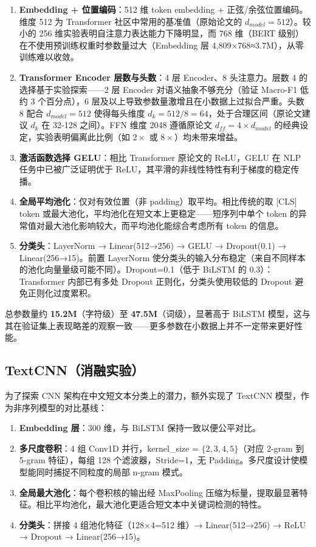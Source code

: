 \begin{enumerate}
\item \textbf{Embedding + 位置编码}：512 维 token embedding + 正弦/余弦位置编码。维度 512 为 Transformer 社区中常用的基准值（原始论文的 $d_{model}=512$）。较小的 256 维实验表明自注意力表达能力下降明显，而 768 维（BERT 级别）在不使用预训练权重时参数量过大（Embedding 层 4,809×768≈3.7M），从零训练难以收敛。

\item \textbf{Transformer Encoder 层数与头数}：4 层 Encoder、8 头注意力。层数 4 的选择基于实验探索——2 层 Encoder 对语义抽象不够充分（验证 Macro-F1 低约 3 个百分点），6 层及以上导致参数量激增且在小数据上过拟合严重。头数 8 配合 $d_{model}=512$ 使得每头维度 $d_k = 512/8 = 64$，处于合理区间（原论文建议 $d_k$ 在 32-128 之间）。FFN 维度 2048 遵循原论文 $d_{ff}=4 \times d_{model}$ 的经典设定，实验表明偏离此比例（如 $2\times$ 或 $8\times$）均未带来增益。

\item \textbf{激活函数选择 GELU}：相比 Transformer 原论文的 ReLU，GELU 在 NLP 任务中已被广泛证明优于 ReLU\cite{devlin2018}，其平滑的非线性特性有利于梯度的稳定传播。

\item \textbf{全局平均池化}：仅对有效位置（非 padding）取平均。相比传统的取 [CLS] token 或最大池化，平均池化在短文本上更稳定——短序列中单个 token 的异常值对最大池化影响较大，而平均池化能综合考虑所有 token 的信息。

\item \textbf{分类头}：LayerNorm → Linear(512→256) → GELU → Dropout(0.1) → Linear(256→15)。前置 LayerNorm 使分类头的输入分布稳定（来自不同样本的池化向量量级可能不同）。Dropout=0.1（低于 BiLSTM 的 0.3）：Transformer 内部已有多处 Dropout 正则化，分类头使用较低的 Dropout 避免正则化过度累积。
\end{enumerate}

总参数量约 \textbf{15.2M}（字符级）至 \textbf{47.5M}（词级），显著高于 BiLSTM 模型，这与其在验证集上表现略差的观察一致——更多参数在小数据上并不一定带来更好性能。

\subsection{TextCNN（消融实验）}

为了探索 CNN 架构在中文短文本分类上的潜力，额外实现了 TextCNN 模型\cite{kim2014}，作为非序列模型的对比基线：

\begin{enumerate}
\item \textbf{Embedding 层}：300 维，与 BiLSTM 保持一致以便公平对比。
\item \textbf{多尺度卷积}：4 组 Conv1D 并行，kernel\_size = $\{2,3,4,5\}$（对应 2-gram 到 5-gram 特征），每组 128 个滤波器，Stride=1，无 Padding。多尺度设计使模型能同时捕捉不同粒度的局部 n-gram 模式。
\item \textbf{全局最大池化}：每个卷积核的输出经 MaxPooling 压缩为标量，提取最显著特征。相比平均池化，最大池化更适合短文本中关键词检测的特性。
\item \textbf{分类头}：拼接 4 组池化特征（128×4=512 维）→ Linear(512→256) → ReLU → Dropout → Linear(256→15)。
\end{enumerate}

